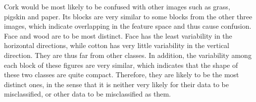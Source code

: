Cork would be most likely to be confused with other images such as grass, pigskin and paper. Its blocks are very similar to some blocks from the other three images, which indicate overlapping in the feature space and thus cause confusion.
Face and wood are to be most distinct. Face has the least variability in the horizontal directions, while cotton has very little variability in the vertical direction. They are thus far from other classes. In addition, the variability among each block of these figures are very similar, which indicates that the shape of these two classes are quite compact. Therefore, they are likely to be the most distinct ones, in the sense that it is neither very likely for their data to be misclassified, or other data to be misclassified as them.